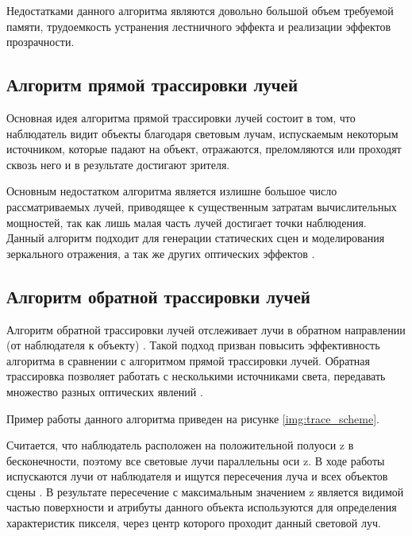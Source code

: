             
                Недостатками данного алгоритма являются довольно большой объем требуемой памяти, трудоемкость устранения лестничного эффекта и реализации эффектов прозрачности.

        \subsection{Алгоритм прямой трассировки лучей}
        
            Основная идея алгоритма прямой трассировки лучей \cite{shykin} состоит в том, что наблюдатель видит объекты благодаря световым лучам, испускаемым некоторым источником, которые падают на объект, отражаются, преломляются или проходят сквозь него и в результате достигают зрителя.
            
            Основным недостатком алгоритма является излишне большое число рассматриваемых лучей, приводящее к существенным затратам вычислительных мощностей, так как лишь малая часть лучей достигает точки наблюдения. Данный алгоритм подходит для генерации статических сцен и моделирования зеркального отражения, а так же других оптических эффектов \cite{traceproblem}.
        
        \subsection{Алгоритм обратной трассировки лучей}
        
            Алгоритм обратной трассировки лучей отслеживает лучи в обратном направлении (от наблюдателя к объекту) \cite{shykin}. Такой подход призван повысить эффективность алгоритма в сравнении с алгоритмом прямой трассировки лучей. Обратная трассировка позволяет работать с несколькими источниками света, передавать множество разных оптических явлений \cite{snizko}.
            
            Пример работы данного алгоритма приведен на рисунке \ref{img:trace_scheme}.
            
            
            Считается, что наблюдатель расположен на положительной полуоси z в бесконечности, поэтому все световые лучи параллельны оси z. В ходе работы испускаются лучи от наблюдателя и ищутся пересечения луча и всех объектов сцены \cite{bayackovskiy}. В результате пересечение с максимальным значением z является видимой частью поверхности и атрибуты данного объекта используются для определения характеристик пикселя, через центр которого проходит данный световой луч. 
            
